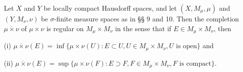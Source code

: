 Let $X$ and $Y$ be locally compact Hausdorff spaces, and let $(X, M_\mu, \mu)$ and $(Y, M_\nu, \nu)$ be $\sigma$-finite measure spaces as in §§ 9 and 10. Then the completion $\overline{\mu \times \nu}$ of $\mu \times \nu$ is regular on $M_\mu \times M_\nu$ in the sense that if $E \in M_\mu \times M_\nu$, then

(i) $\overline{\mu \times \nu}(E) = \inf\{\mu \times \nu(U): E \subset U, U \in M_\mu \times M_\nu, U \text{ is open}\}$ and

(ii) $\overline{\mu \times \nu}(E) = \sup\{\mu \times \nu(F): E \supset F, F \in M_\mu \times M_\nu, F \text{ is compact}\}$.